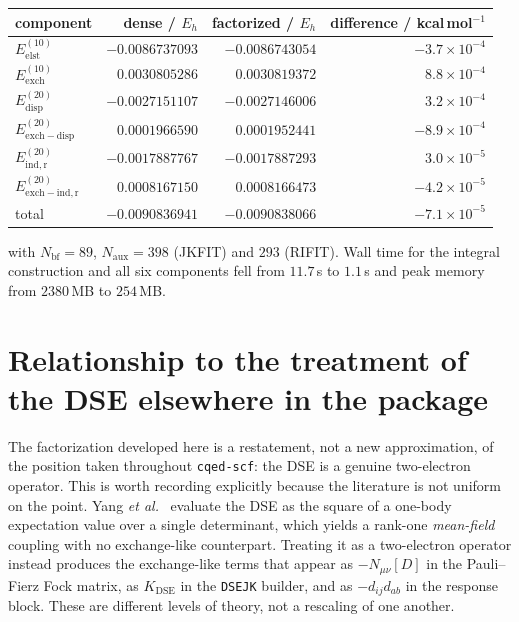 \documentclass[11pt]{article}
\newcommand{\naux}{N_{\mathrm{aux}}}
\begin{document}
\begin{center}
\small
\begin{tabular}{lrrr}
\toprule
component & dense / $E_h$ & factorized / $E_h$ & difference / kcal\,mol$^{-1}$ \\
\midrule
$E^{(10)}_{\mathrm{elst}}$      & $-0.0086737093$ & $-0.0086743054$ & $-3.7\times10^{-4}$ \\
$E^{(10)}_{\mathrm{exch}}$      & $ 0.0030805286$ & $ 0.0030819372$ & $ 8.8\times10^{-4}$ \\
$E^{(20)}_{\mathrm{disp}}$      & $-0.0027151107$ & $-0.0027146006$ & $ 3.2\times10^{-4}$ \\
$E^{(20)}_{\mathrm{exch-disp}}$ & $ 0.0001966590$ & $ 0.0001952441$ & $-8.9\times10^{-4}$ \\
$E^{(20)}_{\mathrm{ind,r}}$     & $-0.0017887767$ & $-0.0017887293$ & $ 3.0\times10^{-5}$ \\
$E^{(20)}_{\mathrm{exch-ind,r}}$& $ 0.0008167150$ & $ 0.0008166473$ & $-4.2\times10^{-5}$ \\
\midrule
total                           & $-0.0090836941$ & $-0.0090838066$ & $-7.1\times10^{-5}$ \\
\bottomrule
\end{tabular}
\end{center}

\noindent
with $N_{\mathrm{bf}} = 89$, $\naux = 398$ (JKFIT) and $293$ (RIFIT). Wall time
for the integral construction and all six components fell from $11.7$\,s to
$1.1$\,s and peak memory from $2380$\,MB to $254$\,MB.

\section{Relationship to the treatment of the DSE elsewhere in the package}

The factorization developed here is a restatement, not a new approximation, of
the position taken throughout \texttt{cqed-scf}: the DSE is a genuine
two-electron operator. This is worth recording explicitly because the
literature is not uniform on the point. Yang \emph{et al.}~\cite{Yang2021}
evaluate the DSE as the square of a one-body expectation value over a single
determinant, which yields a rank-one \emph{mean-field} coupling with no
exchange-like counterpart. Treating it as a two-electron operator instead
produces the exchange-like terms that appear as $-N_{\mu\nu}[D]$ in the
Pauli--Fierz Fock matrix, as $K_{\mathrm{DSE}}$ in the \texttt{DSEJK} builder,
and as $-d_{ij}d_{ab}$ in the response block. These are different levels of
theory, not a rescaling of one another.
\end{document}
